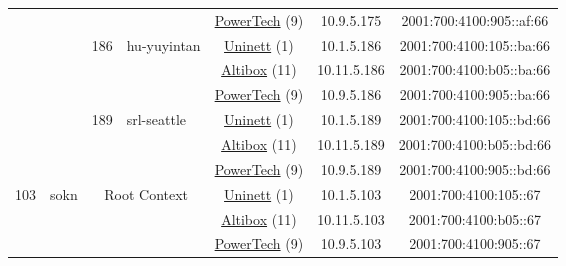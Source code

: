 \begin{small}
\begin{center}
\begin{longtable}{|c|c|c|c|c|c|c|c|}
  &  &  &  & \multicolumn{2}{|c|}{\tiny{\href{http://www.powertech.no}{PowerTech} (9)}} & \tiny{10.9.5.175} & \tiny{2001:700:4100:905::af:66} \\* \cline{3-3}\cline{4-4}\cline{5-5}\cline{6-6}\cline{7-7}\cline{8-8}
  &  & \multirow{3}{*}{\tiny{186}} & \multicolumn{1}{|l|}{\multirow{3}{*}{\tiny{hu-yuyintan}}} & \multicolumn{2}{|c|}{\tiny{\href{https://www.uninett.no}{Uninett} (1)}} & \tiny{10.1.5.186} & \tiny{2001:700:4100:105::ba:66} \\* \cline{5-5}\cline{6-6}\cline{7-7}\cline{8-8}
  &  &  &  & \multicolumn{2}{|c|}{\tiny{\href{https://www.altibox.no}{Altibox} (11)}} & \tiny{10.11.5.186} & \tiny{2001:700:4100:b05::ba:66} \\* \cline{5-5}\cline{6-6}\cline{7-7}\cline{8-8}
  &  &  &  & \multicolumn{2}{|c|}{\tiny{\href{http://www.powertech.no}{PowerTech} (9)}} & \tiny{10.9.5.186} & \tiny{2001:700:4100:905::ba:66} \\* \cline{3-3}\cline{4-4}\cline{5-5}\cline{6-6}\cline{7-7}\cline{8-8}
  &  & \multirow{3}{*}{\tiny{189}} & \multicolumn{1}{|l|}{\multirow{3}{*}{\tiny{srl-seattle}}} & \multicolumn{2}{|c|}{\tiny{\href{https://www.uninett.no}{Uninett} (1)}} & \tiny{10.1.5.189} & \tiny{2001:700:4100:105::bd:66} \\* \cline{5-5}\cline{6-6}\cline{7-7}\cline{8-8}
  &  &  &  & \multicolumn{2}{|c|}{\tiny{\href{https://www.altibox.no}{Altibox} (11)}} & \tiny{10.11.5.189} & \tiny{2001:700:4100:b05::bd:66} \\* \cline{5-5}\cline{6-6}\cline{7-7}\cline{8-8}
  &  &  &  & \multicolumn{2}{|c|}{\tiny{\href{http://www.powertech.no}{PowerTech} (9)}} & \tiny{10.9.5.189} & \tiny{2001:700:4100:905::bd:66} \\ \hline
 \multirow{45}{*}{\tiny{103}} & \multicolumn{1}{|l|}{\multirow{45}{*}{\tiny{sokn}}} & \multicolumn{2}{|c|}{\multirow{3}{*}{\tiny{Root Context}}} & \multicolumn{2}{|c|}{\tiny{\href{https://www.uninett.no}{Uninett} (1)}} & \tiny{10.1.5.103} & \tiny{2001:700:4100:105::67} \\* \cline{5-5}\cline{6-6}\cline{7-7}\cline{8-8}
  &  & \multicolumn{2}{|c|}{} & \multicolumn{2}{|c|}{\tiny{\href{https://www.altibox.no}{Altibox} (11)}} & \tiny{10.11.5.103} & \tiny{2001:700:4100:b05::67} \\* \cline{5-5}\cline{6-6}\cline{7-7}\cline{8-8}
  &  & \multicolumn{2}{|c|}{} & \multicolumn{2}{|c|}{\tiny{\href{http://www.powertech.no}{PowerTech} (9)}} & \tiny{10.9.5.103} & \tiny{2001:700:4100:905::67} \\* \cline{3-3}\cline{4-4}\cline{5-5}\cline{6-6}\cline{7-7}\cline{8-8}

\end{longtable}
\end{center}
\end{small}
